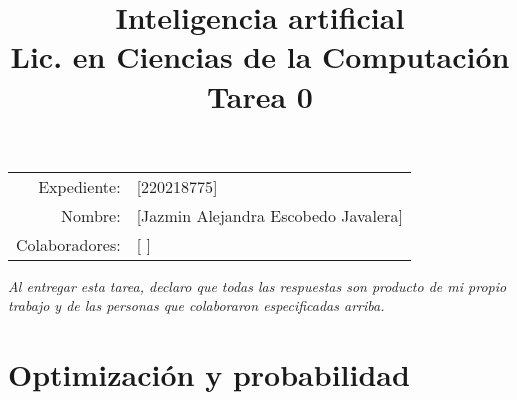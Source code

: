 \documentclass[11pt,letterpaper]{article}
\title{%
  \bfseries
  Inteligencia artificial\\%
  Lic. en Ciencias de la Computación\\%
  Tarea 0
}
\date{}
\begin{document}
\maketitle

\vspace{-2.5cm}
\begin{center}
  \begin{tabular}{rl}
    Expediente: & [220218775]\\
    Nombre: & [Jazmin Alejandra Escobedo Javalera]\\
    Colaboradores: & [ ]\end{tabular}
\end{center}

{\itshape Al entregar esta tarea, declaro que todas las respuestas son
  producto de mi propio trabajo y de las personas que colaboraron
  especificadas arriba.}



\section*{Optimización y probabilidad}
\end{document}
